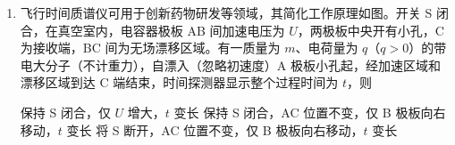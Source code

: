 \documentclass[\gkver]{gaokaozhenti}
\begin{document}
\begin{enumerate}
{C．导体棒下降过程中，感应电动势为 $\overline{E}=\frac{\Delta\Phi}{\Delta t}=\frac{BLh}{\Delta t}$，

感应电流为 $\overline{I}=\frac{\overline{E}}{R}=\frac{BLh}{R\cdot\Delta t}$，

通过导体棒的电荷量大小为 $q=\overline{I}\cdot\Delta t=\frac{BLh}{R}$，故 C 正确；

D．根据题意可知，导体棒下降过程中，先做加速度减小的加速运动，再做加速度增大的减速运动，则导体棒的加速度最大值出现在最低点或初始位置，导体棒速度最大时有 $mg=\frac{B^{2}L^{2}v}{R}+kx'$，

若没有磁场，由能量守恒定律有 $mgx=\frac{1}{2}kx^{2}$，

可知，在最低点时，有 $kx=2mg$，

此时，加速度为 $a=\frac{kx-mg}{m}=g$，

有磁场时，由能量守恒定律可知，弹簧的形变量减小，则最低点时加速度小于 $g$，则导体棒的加速度最大值出现在初始位置，此时，导体棒只受重力，加速度为 $g>\frac{B^{2}L^{2}v}{Rm}$，故 D 错误。

故选 C。
}

\item
飞行时间质谱仪可用于创新药物研发等领域，其简化工作原理如图。开关 S 闭合，在真空室内，电容器极板 AB 间加速电压为 $U$，两极板中央开有小孔，C 为接收端，BC 间为无场漂移区域。有一质量为 $m$、电荷量为 $q$（$q>0$）的带电大分子（不计重力），自漂入（忽略初速度）A 极板小孔起，经加速区域和漂移区域到达 C 端结束，时间探测器显示整个过程时间为 $t$，则 

\onepicture[w=7.61cm]{}

{保持 S 闭合，仅 $U$ 增大，$t$ 变长}
{保持 S 闭合，AC 位置不变，仅 B 极板向右移动，$t$ 变长}
{将 S 断开，AC 位置不变，仅 B 极板向右移动，$t$ 变长}

\end{enumerate}
\end{document}
